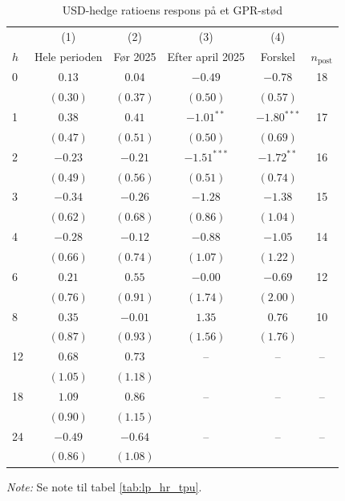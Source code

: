 \begin{table}[H]
\centering
\caption{USD-hedge ratioens respons på et GPR-stød}
\label{tab:lp_hr_gpr}
\begin{threeparttable}
\begin{tabular}{l cccc c}
\toprule
 & (1) & (2) & (3) & (4) & \\
$h$ & Hele perioden & Før 2025 & Efter april 2025 & Forskel & $n_{\text{post}}$ \\
\midrule
0 & $0.13$ & $0.04$ & $-0.49$ & $-0.78$ & 18 \\
 & $(0.30)$ & $(0.37)$ & $(0.50)$ & $(0.57)$ & \\[2pt]
1 & $0.38$ & $0.41$ & $-1.01^{**}$ & $-1.80^{***}$ & 17 \\
 & $(0.47)$ & $(0.51)$ & $(0.50)$ & $(0.69)$ & \\[2pt]
2 & $-0.23$ & $-0.21$ & $-1.51^{***}$ & $-1.72^{**}$ & 16 \\
 & $(0.49)$ & $(0.56)$ & $(0.51)$ & $(0.74)$ & \\[2pt]
3 & $-0.34$ & $-0.26$ & $-1.28$ & $-1.38$ & 15 \\
 & $(0.62)$ & $(0.68)$ & $(0.86)$ & $(1.04)$ & \\[2pt]
4 & $-0.28$ & $-0.12$ & $-0.88$ & $-1.05$ & 14 \\
 & $(0.66)$ & $(0.74)$ & $(1.07)$ & $(1.22)$ & \\[2pt]
6 & $0.21$ & $0.55$ & $-0.00$ & $-0.69$ & 12 \\
 & $(0.76)$ & $(0.91)$ & $(1.74)$ & $(2.00)$ & \\[2pt]
8 & $0.35$ & $-0.01$ & $1.35$ & $0.76$ & 10 \\
 & $(0.87)$ & $(0.93)$ & $(1.56)$ & $(1.76)$ & \\[2pt]
12 & $0.68$ & $0.73$ & – & – & – \\
 & $(1.05)$ & $(1.18)$ &  &  & \\[2pt]
18 & $1.09$ & $0.86$ & – & – & – \\
 & $(0.90)$ & $(1.15)$ &  &  & \\[2pt]
24 & $-0.49$ & $-0.64$ & – & – & – \\
 & $(0.86)$ & $(1.08)$ &  &  & \\[2pt]
\bottomrule
\end{tabular}
\begin{tablenotes}[flushleft]\footnotesize
\item \textit{Note:} Se note til tabel \ref{tab:lp_hr_tpu}.
\end{tablenotes}
\end{threeparttable}
\end{table}
